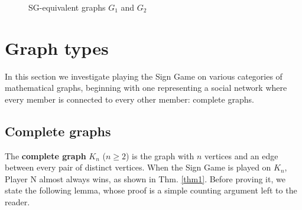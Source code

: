 \documentclass[amsart,11pt]{article}
\theoremstyle{dotless}
\theoremstyle{dotless}
\begin{document}
\begin{figure}[htb]  
\centering  

\hspace{50pt}

\caption{SG-equivalent graphs $G_1$ and $G_2$}
\label{fig2}
\end{figure}


\section{Graph types}

In this section we investigate playing the Sign Game on various categories of mathematical graphs, beginning with one representing a social network where every member is connected to every other member: complete graphs.

\subsection{Complete graphs}

The \textbf{complete graph} $K_n$ ($n \geq 2$) is the graph with $n$ vertices and an edge between every pair of distinct vertices. When the Sign Game is played on $K_n$, Player N almost always wins, as shown in Thm. \ref{thm1}. Before proving it, we state the following lemma, whose proof is a simple counting argument left to the reader. 
\end{document}
